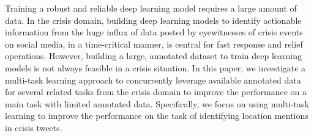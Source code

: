 Training a robust and reliable deep learning model requires a large amount of data. In the crisis domain, building deep learning models to identify actionable information from the huge influx of data posted by eyewitnesses of crisis events on social media, in a time-critical manner, is central for fast response and relief operations. However, building a large, annotated dataset to train deep learning models is not always feasible in a crisis situation. In this paper, we investigate a multi-task learning approach to concurrently leverage available annotated data for several related tasks from the crisis domain to improve the performance on a main task with limited annotated data. Specifically, we focus on using multi-task learning to improve the performance on the task of identifying location mentions in crisis tweets.
